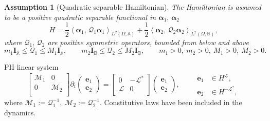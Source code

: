 \documentclass[aspectratio=169]{ISAE-Beamer}
\newcommand{\inner}[3][]{\ensuremath{\left\langle #2, \, #3 \right\rangle_{#1}}}
\newtheorem{assumption}{Assumption}
\begin{document}
\begin{frame}
\begin{assumption}[Quadratic separable Hamiltonian]
	The Hamiltonian is assumed to be a positive quadratic separable functional in $\bm{\alpha}_1, \, \bm{\alpha}_2$ 
	\begin{equation*}
	H = \frac{1}{2} \inner[L^2(\Omega, \mathbb{A})]{\bm{\alpha}_{1}}{\mathcal{Q}_1\bm{\alpha}_{1}} + \frac{1}{2} \inner[L^2(\Omega, \mathbb{B})]{\bm{\alpha}_{2}}{\mathcal{Q}_2\bm{\alpha}_{2}},
	\end{equation*}
	where $\mathcal{Q}_1, \, \mathcal{Q}_2$ are positive symmetric operators, bounded from below and above
	\begin{equation*}
	m_1 \bm{I}_\mathbb{A} \le\mathcal{Q}_1 \le M_1 \bm{I}_\mathbb{A}, \qquad  m_2 \bm{I}_\mathbb{B} \le \mathcal{Q}_2 \le M_2 \bm{I}_\mathbb{B}, \qquad m_1>0, \ m_2>0, \ M_1>0, \ M_2>0.
	\end{equation*} 
\end{assumption}


\begin{exampleblock}{PH linear system}
\begin{equation*}
\begin{bmatrix}
\mathcal{M}_1 & 0 \\
0 & \mathcal{M}_2 \\
\end{bmatrix}
\partial_t \begin{pmatrix}
\bm{e}_1 \\ \bm{e}_2
\end{pmatrix} = \begin{bmatrix}
0 &  - \mathcal{L}^* \\
\mathcal{L} & 0 \\
\end{bmatrix}\begin{pmatrix}
\bm{e}_1 \\ \bm{e}_2
\end{pmatrix} , \qquad \begin{aligned}
\bm{e}_1 &\in H^{\mathcal{L}}, 	\\
\bm{e}_2 &\in H^{-\mathcal{L}^*},
\end{aligned}
\end{equation*}
where $\mathcal{M}_1:=\mathcal{Q}_1^{-1},\; \mathcal{M}_2:=\mathcal{Q}_2^{-1}$. Constitutive laws have been included in the dynamics.
\end{exampleblock}

\end{frame}
\end{document}
